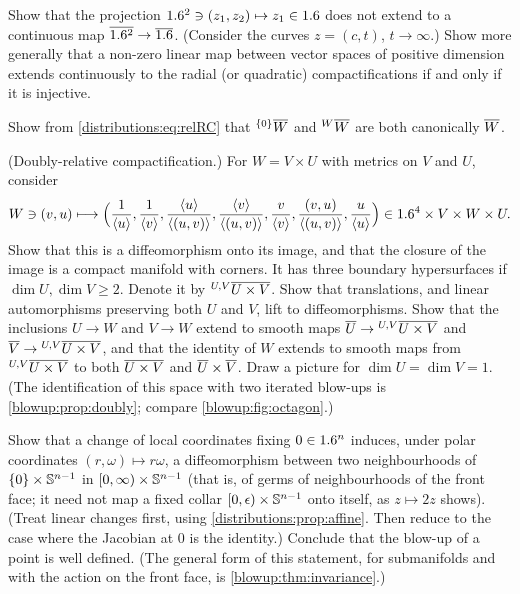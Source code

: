 \begin{exercise}\label{distributions:ex:projection}
Show that the projection $1.6^2\ni(z_1,z_2)\mapsto z_1\in1.6$ does not extend to a
continuous map $\overline{1.6^2}\to\overline{1.6}$. (Consider the curves $z=(c,t)$, $t\to\infty$.)
Show more generally that a non-zero linear map between vector spaces of positive
dimension extends continuously to the radial (or quadratic) compactifications if and only if it is
injective.
\end{exercise}

\begin{exercise}\label{distributions:ex:trivial}
Show from \eqref{distributions:eq:relRC} that ${}^{\{0\}}\overline{W}$ and ${}^{W}\overline{W}$ are
both canonically $\overline{W}$.
\end{exercise}

\begin{exercise}\label{distributions:ex:doubly}
(Doubly-relative compactification.) For $W=V\times U$ with metrics on $V$ and $U$,
consider
\[
  W\ni(v,u)\longmapsto\Big(\frac{1}{\langle u\rangle},\frac{1}{\langle v\rangle},
  \frac{\langle u\rangle}{\langle (u,v)\rangle},\frac{\langle v\rangle}{\langle (u,v)\rangle},\frac{v}{\langle v\rangle},
  \frac{(v,u)}{\langle (u,v)\rangle},\frac{u}{\langle u\rangle}\Big)\in1.6^4\times V\times W\times U.
\]
Show that this is a diffeomorphism onto its image, and that the closure of the image is
a compact manifold with corners. It has three boundary hypersurfaces if
$\dim U,\dim V\ge2$. Denote it by ${}^{U,V}\overline{U\times V}$. Show that translations, and
linear automorphisms preserving both $U$ and $V$, lift to diffeomorphisms. Show that the
inclusions $U\to W$ and $V\to W$ extend to smooth maps
$\overline{U}\to{}^{U,V}\overline{U\times V}$ and $\overline{V}\to{}^{U,V}\overline{U\times V}$, and that the identity of $W$
extends to smooth maps from ${}^{U,V}\overline{U\times V}$ to both $\overline{U\times V}$ and
$\overline{U}\times\overline{V}$. Draw a picture for $\dim U=\dim V=1$. (The identification of this
space with two iterated blow-ups is \cref{blowup:prop:doubly}; compare
\cref{blowup:fig:octagon}.)
\end{exercise}

\begin{exercise}\label{distributions:ex:polar}
Show that a change of local coordinates fixing $0\in1.6^n$ induces, under polar
coordinates $(r,\omega)\mapsto r\omega$, a diffeomorphism between two neighbourhoods of
$\{0\}\times\mathbb{S}^{n-1}$ in $[0,\infty)\times\mathbb{S}^{n-1}$ (that is, of germs of
neighbourhoods of the front face; it need not map a fixed collar
$[0,\epsilon)\times\mathbb{S}^{n-1}$ onto itself, as $z\mapsto2z$ shows). (Treat linear changes first, using
\cref{distributions:prop:affine}. Then reduce to the case where the Jacobian at $0$ is
the identity.) Conclude that the blow-up of a point is well defined. (The general form of
this statement, for submanifolds and with the action on the front face, is
\cref{blowup:thm:invariance}.)
\end{exercise}

